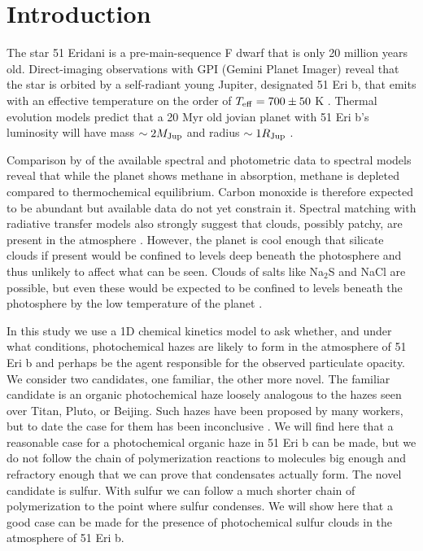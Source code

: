 \documentclass[preprint]{aastex6}
\newcounter{reaction}
\begin{document}

 \linenumbers
\section{Introduction}

The star 51 Eridani is a pre-main-sequence F dwarf that is only 20 million years old.  
Direct-imaging observations with GPI (Gemini Planet Imager)
 reveal that the star is orbited by a self-radiant young Jupiter, designated 51 Eri b, that emits with
an effective temperature on the order of $T_{\rm eff} = 700 \pm 50$ K \citep{Macintosh2015}.
Thermal evolution models predict that a 20 Myr old jovian planet with 51 Eri b's luminosity will
have mass $\sim 2 M_{\rm Jup}$ and radius $\sim 1 R_{\rm Jup}$ \citep{Macintosh2015}. 

Comparison by \citet{Macintosh2015} of the available spectral and photometric data to spectral models reveal
that while the planet shows methane in absorption, methane is depleted compared to 
thermochemical equilibrium. Carbon monoxide is therefore expected to be abundant
but available data do not yet constrain it.
Spectral matching with radiative transfer models also strongly suggest that clouds, possibly patchy, are present in the atmosphere \citep{Macintosh2015}.
However, the planet is cool enough that silicate clouds 
if present would be confined to levels deep beneath the photosphere and thus unlikely to affect what can be seen. %
Clouds of salts like Na$_2$S and NaCl are possible, but even these would be expected
to be confined to levels beneath the photosphere 
by the low temperature of the planet \citep{Morley2012}.

In this study we use a 1D chemical kinetics model to ask whether, and under what conditions,
photochemical hazes are likely to form in the atmosphere of 51 Eri b
and perhaps be the agent responsible for the observed particulate opacity.
We consider two candidates, one familiar, the other more novel.
The familiar candidate is an organic photochemical haze loosely analogous to the hazes seen over Titan,
Pluto, or Beijing.
Such hazes have been proposed by many workers, but to date
the case for them has been inconclusive \citep{Moses2014}.
We will find here that a reasonable case for a photochemical organic haze in 51 Eri b can be made, but we do not follow the chain
of polymerization reactions to molecules big enough and refractory enough that we can prove that condensates actually form.   
The novel candidate is sulfur. 
With sulfur we can follow a much shorter chain of polymerization to the point where sulfur condenses.
We will show here that a good case
can be made for the presence of photochemical sulfur clouds in the atmosphere of 51 Eri b. %
\end{document}
